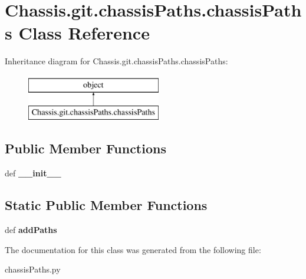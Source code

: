 \hypertarget{class_chassis_8git_1_1chassis_paths_1_1chassis_paths}{\section{Chassis.\-git.\-chassis\-Paths.\-chassis\-Paths Class Reference}
\label{class_chassis_8git_1_1chassis_paths_1_1chassis_paths}
}
Inheritance diagram for Chassis.\-git.\-chassis\-Paths.\-chassis\-Paths\-:\begin{figure}[H]
\begin{center}
\leavevmode
\includegraphics[height=2.000000cm]{class_chassis_8git_1_1chassis_paths_1_1chassis_paths}
\end{center}
\end{figure}
\subsection*{Public Member Functions}
\begin{DoxyCompactItemize}
\item 
\hypertarget{class_chassis_8git_1_1chassis_paths_1_1chassis_paths_a849445f60ecf4e68b3ce50febc381221}{def {\bfseries \-\_\-\-\_\-init\-\_\-\-\_\-}}\label{class_chassis_8git_1_1chassis_paths_1_1chassis_paths_a849445f60ecf4e68b3ce50febc381221}

\end{DoxyCompactItemize}
\subsection*{Static Public Member Functions}
\begin{DoxyCompactItemize}
\item 
\hypertarget{class_chassis_8git_1_1chassis_paths_1_1chassis_paths_ae200fda012060c4da6f9dcb46cfc1891}{def {\bfseries add\-Paths}}\label{class_chassis_8git_1_1chassis_paths_1_1chassis_paths_ae200fda012060c4da6f9dcb46cfc1891}

\end{DoxyCompactItemize}


The documentation for this class was generated from the following file\-:\begin{DoxyCompactItemize}
\item 
chassis\-Paths.\-py\end{DoxyCompactItemize}
